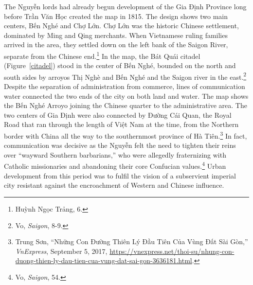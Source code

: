 \en

\begin{figure}[!ht]
\end{figure}

\vi
The Nguyễn lords had already begun development of the Gia Định Province long before Trần Văn Học created the map in 1815. The design shows two main centers, Bến Nghé and Chợ Lớn. Chợ Lớn was the historic Chinese settlement, dominated by Ming and Qing merchants. When Vietnamese ruling families arrived in the area, they settled down on the left bank of the Saigon River, separate from the Chinese end.\footnote{Huỳnh Ngọc Trảng, 6.} In the map, the Bát Quái citadel (Figure~\ref{citadel}) stood in the center of Bến Nghé, bounded on the north and south sides by arroyos Thị Nghè and Bến Nghé and the Saigon river in the east.\footnote{Vo, \textit{Saigon}, 8-9.} Despite the separation of administration from commerce, lines of communication water connected the two ends of the city on both land and water. The map shows the Bến Nghé Arroyo joining the Chinese quarter to the administrative area. The two centers of Gia Định were also connected by Đường Cái Quan, the Royal Road that ran through the length of Việt Nam at the time, from the Northern border with China all the way to the southernmost province of Hà Tiên.\footnote{Trung Sơn, “Những Con Đường Thiên Lý Đầu Tiên Của Vùng Đất Sài Gòn,” \textit{VnExpress}, September 5, 2017, \url{https://vnexpress.net/thoi-su/nhung-con-duong-thien-ly-dau-tien-cua-vung-dat-sai-gon-3636181.html}.} In fact, communication was decisive as the Nguyễn felt the need to tighten their reins over “wayward Southern barbarians,” who were allegedly fraternizing with Catholic missionaries and abandoning their core Confucian values.\footnote{Vo, \textit{Saigon}, 54.} Urban development from this period was to fulfil the vision of a subservient imperial city resistant against the encroachment of Western and Chinese influence.

